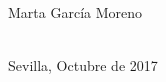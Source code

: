 \begin{titlepage}
\begin{minipage}{14cm}
\HRule \\[4cm]


{\Large

Marta García Moreno} \\[0.5cm]

{\large
Sevilla, Octubre de 2017
}

\end{minipage}

\vfill %

\cleardoublepage
\thispagestyle{empty}
\end{titlepage}

\raggedbottom


